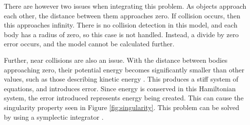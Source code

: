 \documentclass{article}
\begin{document}
There are however two issues when integrating this problem. As objects
approach each other, the distance between them approaches zero. If collision
occurs, then this approaches infinity. There is no collision detection in
this model, and each body has a radius of zero, so this case is not handled.
Instead, a divide by zero error occurs, and the model cannot be calculated
further.

Further, near collisions are also an issue. With the distance between bodies
approaching zero, their potential energy becomes significantly smaller than
other values, such as those describing kinetic energy
\cite{chambers1999hybrid}. This produces a stiff system of equations, and
introduces error. Since energy is conserved in this Hamiltonian system, the
error introduced represents energy being created. This can cause the
singularity property seen in Figure \ref{fig:singularity}. This problem can
be solved by using a symplectic integrator \cite{chambers1999hybrid}.
\end{document}
